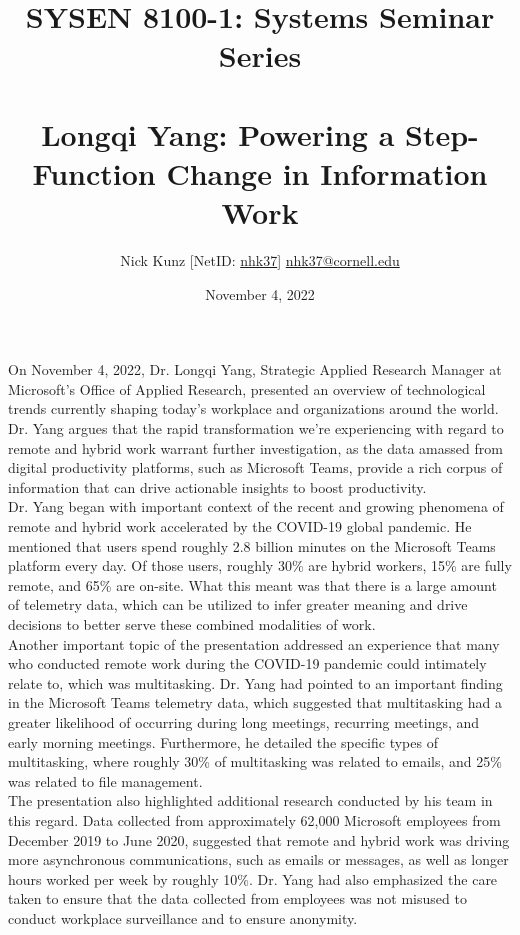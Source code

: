 \documentclass[11pt]{article}
\begin{document}
\title{SYSEN 8100-1: Systems Seminar Series\\~\\
    \Large Longqi Yang: Powering a Step-Function Change in Information Work
}
\author{
    Nick Kunz [NetID: \url{nhk37}] \hyperlink{nhk37@cornell.edu}{nhk37@cornell.edu}
}
\date{November 4, 2022}
\maketitle

On November 4, 2022, Dr. Longqi Yang, Strategic Applied Research Manager at Microsoft's Office of Applied Research, presented an overview of technological trends currently shaping today's workplace and organizations around the world. Dr. Yang argues that the rapid transformation we're experiencing with regard to remote and hybrid work warrant further investigation, as the data amassed from digital productivity platforms, such as Microsoft Teams, provide a rich corpus of information that can drive actionable insights to boost productivity.\\

Dr. Yang began with important context of the recent and growing phenomena of remote and hybrid work accelerated by the COVID-19 global pandemic. He mentioned that users spend roughly 2.8 billion minutes on the Microsoft Teams platform every day. Of those users, roughly 30\% are hybrid workers, 15\% are fully remote, and 65\% are on-site. What this meant was that there is a large amount of telemetry data, which can be utilized to infer greater meaning and drive decisions to better serve these combined modalities of work.\\

Another important topic of the presentation addressed an experience that many who conducted remote work during the COVID-19 pandemic could intimately relate to, which was multitasking. Dr. Yang had pointed to an important finding in the Microsoft Teams telemetry data, which suggested that multitasking had a greater likelihood of occurring during long meetings, recurring meetings, and early morning meetings. Furthermore, he detailed the specific types of multitasking, where roughly 30\% of multitasking was related to emails, and 25\% was related to file management.\\

The presentation also highlighted additional research conducted by his team in this regard. Data collected from approximately 62,000 Microsoft employees from December 2019 to June 2020, suggested that remote and hybrid work was driving more asynchronous communications, such as emails or messages, as well as longer hours worked per week by roughly 10\%. Dr. Yang had also emphasized the care taken to ensure that the data collected from employees was not misused to conduct workplace surveillance and to ensure anonymity. \\
\end{document}
